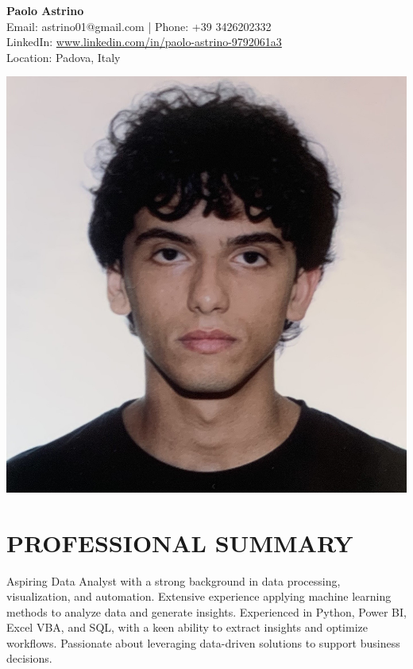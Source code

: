 \documentclass[a4paper,10pt]{article}
\begin{document}
\pagestyle{empty}

\begin{minipage}[t]{0.7\textwidth}
\begin{flushleft}
    {\Huge \textbf{Paolo Astrino}} \\
    \vspace{2mm}
    Email: astrino01@gmail.com | Phone: +39 3426202332 \\
    LinkedIn: \href{https://www.linkedin.com/in/paolo-astrino-9792061a3}{www.linkedin.com/in/paolo-astrino-9792061a3} \\
    Location: Padova, Italy
\end{flushleft}
\end{minipage}%
\begin{minipage}[t]{0.3\textwidth}
\begin{flushright}
    \includegraphics[width=0.8\linewidth]{fototessera.JPG}
\end{flushright}
\end{minipage}

\vspace{0.5cm} %

\section*{PROFESSIONAL SUMMARY}
Aspiring Data Analyst with a strong background in data processing, visualization, and automation.
Extensive experience applying machine learning methods to analyze data and generate insights.
Experienced in Python, Power BI, Excel VBA, and SQL, with a keen ability to extract insights and optimize
workflows. Passionate about leveraging data-driven solutions to support business decisions.
\end{document}

